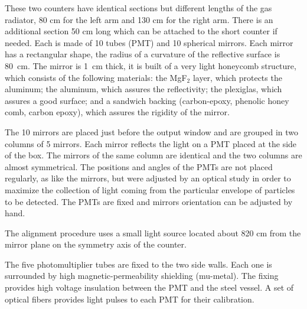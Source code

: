 {These two counters have identical sections but different lengths of 
the gas radiator, 80 cm for the left arm and 130 cm for the right arm. 
There is an additional section 50 cm long which can be attached to 
the short counter if needed.
Each \Cherenkov{} is made of 10  tubes (PMT) and 10 spherical mirrors. 
Each mirror has a rectangular shape, the radius of a curvature of the reflective
surface is 80~cm. 
The mirror is 1~cm thick, it is built of a very light honeycomb structure, which
consists of the following materials:  
the MgF$_2$ layer, which protects 
the aluminum; the aluminum, which assures the reflectivity; 
the plexiglas, which assures a good surface; and  
a sandwich backing (carbon-epoxy, phenolic honey comb, carbon epoxy), 
which assures the rigidity of the mirror. 

The 10 mirrors are placed just before the output window and are grouped in 
two columns of 5 mirrors. 
Each mirror reflects the light on a PMT placed at the side of the box. 
The mirrors of the same column are identical and the two columns are 
almost symmetrical. 
The positions and angles of the PMTs are not placed regularly, as like the mirrors, 
but were adjusted by an optical study in order to maximize the collection of light 
coming from the particular envelope of particles to be detected.
The PMTs are fixed and mirrors orientation can be adjusted by hand. 

The alignment procedure uses a small light source located about 820 cm
from the mirror plane on the symmetry axis of the counter.

The five photomultiplier tubes are fixed to the two side walls. 
Each one is surrounded by high magnetic-permeability shielding (mu-metal). 
The fixing provides high voltage insulation between the PMT and the steel vessel. 
A set of optical fibers provides light pulses to each PMT for their calibration. 
}


